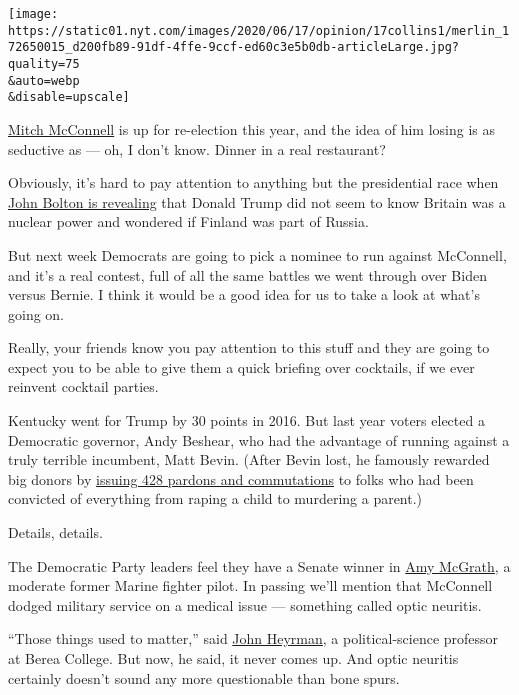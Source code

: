 \texttt{[image: https://static01.nyt.com/images/2020/06/17/opinion/17collins1/merlin\_172650015\_d200fb89-91df-4ffe-9ccf-ed60c3e5b0db-articleLarge.jpg?quality=75\\\&auto=webp\\\&disable=upscale]}

\href{https://www.nytimes.com/2020/06/23/us/politics/mitch-mcconnell-kentucky-primary.html}{Mitch
McConnell} is up for re-election this year, and the idea of him losing
is as seductive as --- oh, I don't know. Dinner in a real restaurant?

Obviously, it's hard to pay attention to anything but the presidential
race when
\href{https://www.nytimes.com/2020/06/17/us/politics/bolton-book-trump-impeached.html}{John
Bolton is revealing} that Donald Trump did not seem to know Britain was
a nuclear power and wondered if Finland was part of Russia.

But next week Democrats are going to pick a nominee to run against
McConnell, and it's a real contest, full of all the same battles we went
through over Biden versus Bernie. I think it would be a good idea for us
to take a look at what's going on.

Really, your friends know you pay attention to this stuff and they are
going to expect you to be able to give them a quick briefing over
cocktails, if we ever reinvent cocktail parties.

Kentucky went for Trump by 30 points in 2016. But last year voters
elected a Democratic governor, Andy Beshear, who had the advantage of
running against a truly terrible incumbent, Matt Bevin. (After Bevin
lost, he famously rewarded big donors by
\href{https://www.courier-journal.com/story/news/politics/2019/12/11/bevin-issued-hundreds-pardons-and-commutations-final-day/4399770002/}{issuing
428 pardons and commutations} to folks who had been convicted of
everything from raping a child to murdering a parent.)

Details, details.

The Democratic Party leaders feel they have a Senate winner in
\href{https://www.nytimes.com/2020/06/22/us/politics/charles-booker-amy-mcgrath-kentucky-adverstising.html}{Amy
McGrath}, a moderate former Marine fighter pilot. In passing we'll
mention that McConnell dodged military service on a medical issue ---
something called optic neuritis.

``Those things used to matter,'' said
\href{https://www.berea.edu/psc/faculty-and-staff/dr-john-heyrman/}{John
Heyrman}, a political-science professor at Berea College. But now, he
said, it never comes up. And optic neuritis certainly doesn't sound any
more questionable than bone spurs.

